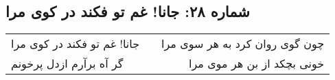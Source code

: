 \begin{center}
\section*{شماره ۲۸: جانا! غم تو فکند در کوی مرا}
\label{sec:028}
\begin{longtable}{l p{0.5cm} r}
جانا! غم تو فکند در کوی مرا
&&
چون گوی روان کرد به هر سوی مرا
\\
گر آه برآرم ازدل پرخونم
&&
خونی بچکد از بن هر موی مرا
\\
\end{longtable}
\end{center}
